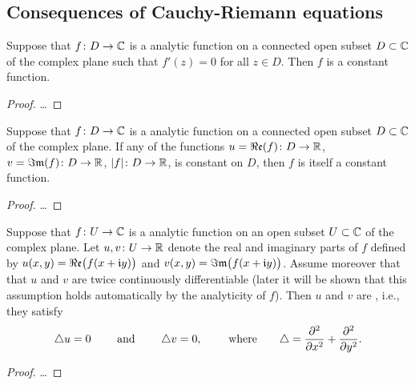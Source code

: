 \subsection{Consequences of Cauchy-Riemann equations}

\begin{lemma}
  \label{lem:zero_derivative_implies_constant}
  Suppose that $f \colon D \to \mathbb{C}$ is a analytic function
  on a connected open subset $D \subset \mathbb{C}$ of the complex plane
  such that $f'(z) = 0$ for all $z \in D$.
  Then $f$ is a constant function.
\end{lemma}
\begin{proof}
  \ldots
\end{proof}

\begin{theorem}
  \label{thm:constantness_criteria}
  Suppose that $f \colon D \to \mathbb{C}$ is a analytic function
  on a connected open subset $D \subset \mathbb{C}$ of the complex plane.
  If any of the functions $u = \Re\mathfrak{e}(f) \colon D \to \mathbb{R}$,
  $v = \Im\mathfrak{m}(f) \colon D \to \mathbb{R}$, $|f| \colon D \to \mathbb{R}$,
  is constant on $D$, then $f$ is itself a constant function.
\end{theorem}
\begin{proof}
  \ldots
\end{proof}

\begin{lemma}
  \label{lem:real_and_imaginary_parts_harmonic}
  Suppose that $f \colon U \to \mathbb{C}$ is a analytic function
  on an open subset $U \subset \mathbb{C}$ of the complex plane.
  Let $u,v \colon U \to \mathbb{R}$ denote the real and imaginary
  parts of $f$ defined by $u(x,y) = \Re\mathfrak{e} \big( f(x + \mathfrak{i} y)\big)$
  and $v(x,y) = \Im\mathfrak{m} \big( f(x + \mathfrak{i} y)\big)$. Assume
  moreover that that $u$ and $v$ are twice continuously differentiable
  (later it will be shown that this assumption holds automatically
  by the analyticity of $f$).
  Then $u$ and $v$ are ,
  i.e., they satisfy %
  \begin{align*}
    \triangle u = 0 \qquad \text{ and } \qquad \triangle v = 0 ,
    \qquad \text{ where} \qquad
    \triangle = \frac{\partial^2}{\partial {x}^2} + \frac{\partial^2}{\partial {y}^2} .
  \end{align*}
\end{lemma}
\begin{proof}
  \ldots
\end{proof}

